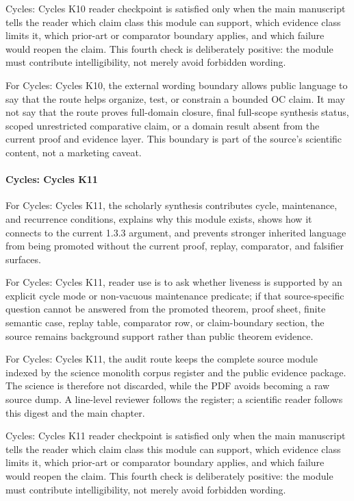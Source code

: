Cycles: Cycles K10 reader checkpoint is satisfied only when the main manuscript tells the reader which claim class this module can support, which evidence class limits it, which prior-art or comparator boundary applies, and which failure would reopen the claim. This fourth check is deliberately positive: the module must contribute intelligibility, not merely avoid forbidden wording.


For Cycles: Cycles K10, the external wording boundary allows public language to say that the route helps organize, test, or constrain a bounded OC claim. It may not say that the route proves full-domain closure, final full-scope synthesis status, scoped unrestricted comparative claim, or a domain result absent from the current proof and evidence layer. This boundary is part of the source's scientific content, not a marketing caveat.


\paragraph{Cycles: Cycles K11}

For Cycles: Cycles K11, the scholarly synthesis contributes cycle, maintenance, and recurrence conditions, explains why this module exists, shows how it connects to the current 1.3.3 argument, and prevents stronger inherited language from being promoted without the current proof, replay, comparator, and falsifier surfaces.


For Cycles: Cycles K11, reader use is to ask whether liveness is supported by an explicit cycle mode or non-vacuous maintenance predicate; if that source-specific question cannot be answered from the promoted theorem, proof sheet, finite semantic case, replay table, comparator row, or claim-boundary section, the source remains background support rather than public theorem evidence.


For Cycles: Cycles K11, the audit route keeps the complete source module indexed by the science monolith corpus register and the public evidence package. The science is therefore not discarded, while the PDF avoids becoming a raw source dump. A line-level reviewer follows the register; a scientific reader follows this digest and the main chapter.


Cycles: Cycles K11 reader checkpoint is satisfied only when the main manuscript tells the reader which claim class this module can support, which evidence class limits it, which prior-art or comparator boundary applies, and which failure would reopen the claim. This fourth check is deliberately positive: the module must contribute intelligibility, not merely avoid forbidden wording.



